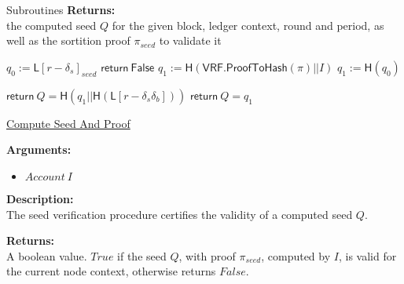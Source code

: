 \documentclass[10pt,a4paper]{article}
\begin{document}
\begin{section}{Subroutines}
\noindent \textbf{Returns:} \\
    the computed seed $Q$ for the given block, ledger context, round and period, as well as the sortition proof $\pi_{seed}$
    to validate it


\begin{algorithm}[H]\label{algo:verify-seed}
    \begin{algorithmic}[1]
        \State $q_0 := \mathsf{L}[r-\delta_s]_{seed}$
                    \State $\mathsf{return} \ \mathsf{False}$
                \EndIf
                \State $q_1 := \mathsf{H}(\mathsf{VRF.ProofToHash}(\pi)||I)$
            \Else
                \State $q_1 := \mathsf{H}(q_0)$
            \EndIf


            \State $\mathsf{return} \ Q = \mathsf{H}(q_1||\mathsf{H}(\mathsf{L}[r-\delta_s\delta_b]))$
        \Else
            \State $\mathsf{return} \ Q = q_1$
        \EndIf
    \EndFunction
    \end{algorithmic}
    \caption{\underline{Compute Seed And Proof}}
\end{algorithm}


\noindent \textbf{Arguments:}
\begin{itemize}
    \item $Account \ I$
  \end{itemize}


\noindent \textbf{Description:}\\ The seed verification procedure certifies the validity of a computed seed $Q$.


\noindent \textbf{Returns:}\\ A boolean value. $True$ if the seed $Q$, with proof $\pi_{seed}$, computed by $I$,
    is valid for the current node context, otherwise returns $False$.


\begin{algorithm}[H]\label{algo:get-sortition-weight}
    \begin{algorithmic}[1]


\end{algorithmic}
\end{algorithm}
\end{section}
\end{document}
